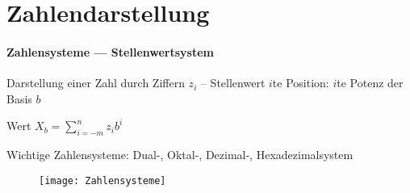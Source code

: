 \section{Zahlendarstellung}
\label{sec:zahlendarstellung}

\paragraph{Zahlensysteme --- Stellenwertsystem}
\begin{items}
	\item Darstellung einer Zahl durch Ziffern $z_i$ -- Stellenwert $i$te Position: $i$te Potenz der Basis $b$
	\item Wert $X_b = \sum _{i=-m}^n z_ib^i$
	\item Wichtige Zahlensysteme: Dual-, Oktal-, Dezimal-, Hexadezimalsystem
\end{items}
\begin{figure}[H]
  \centering
  \texttt{[image: Zahlensysteme]}
 \label{Zahlensysteme}
\end{figure}

